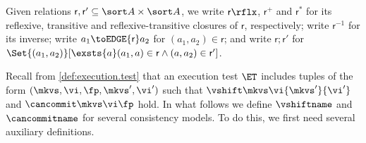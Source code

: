 Given relations $\mathsf r, \mathsf r' \subseteq \sort A \times \sort A$,
we write $\mathsf r\rflx$, $\mathsf r^+$ and $\mathsf r^*$ for its reflexive, transitive and reflexive-transitive closures of $\mathsf r$, respectively;
write $\mathsf r^{-1}$ for its inverse;
write $a_1 \toEDGE{\mathsf r} a_2$ for $(a_1, a_2) \in \mathsf r$;
and write \( \mathsf r; \mathsf r'\) for \( \Set{(a_1,a_2)}[\exsts{a} (a_1,a) \in \mathsf r\land (a,a_2) \in \mathsf r']\).

%
%
%

Recall from \cref{def:execution.test} that an execution test $\ET$ includes tuples of the form $(\mkvs,\vi, \fp, \mkvs', \vi')$ such that $\vshift \mkvs \vi {\mkvs'} {\vi'}$ and $\cancommit \mkvs \vi \fp$ hold. 
%
In what follows we define $\vshiftname$ and $\cancommitname$ for several consistency models. To do this, we first need several auxiliary definitions. 


